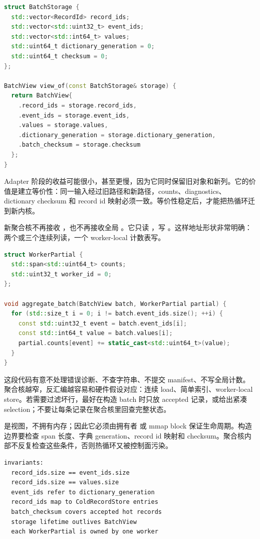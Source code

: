 \begin{lstlisting}[language=C++,caption={adapter 把旧对象转换为热列存储}]
struct BatchStorage {
  std::vector<RecordId> record_ids;
  std::vector<std::uint32_t> event_ids;
  std::vector<std::int64_t> values;
  std::uint64_t dictionary_generation = 0;
  std::uint64_t checksum = 0;
};

BatchView view_of(const BatchStorage& storage) {
  return BatchView{
    .record_ids = storage.record_ids,
    .event_ids = storage.event_ids,
    .values = storage.values,
    .dictionary_generation = storage.dictionary_generation,
    .batch_checksum = storage.checksum
  };
}
\end{lstlisting}

Adapter 阶段的收益可能很小，甚至更慢，因为它同时保留旧对象和新列。它的价值是建立等价性：同一输入经过旧路径和新路径，counts、diagnostics、dictionary checksum 和 record id 映射必须一致。等价性稳定后，才能把热循环迁到新内核。

新聚合核不再接收 ，也不再接收全局 。它只读 ，写 。这样地址形状非常明确：两个或三个连续列读，一个 worker-local 计数表写。

\begin{lstlisting}[language=C++,caption={BatchView 聚合核只保留热路径依赖}]
struct WorkerPartial {
  std::span<std::uint64_t> counts;
  std::uint32_t worker_id = 0;
};

void aggregate_batch(BatchView batch, WorkerPartial partial) {
  for (std::size_t i = 0; i != batch.event_ids.size(); ++i) {
    const std::uint32_t event = batch.event_ids[i];
    const std::int64_t value = batch.values[i];
    partial.counts[event] += static_cast<std::uint64_t>(value);
  }
}
\end{lstlisting}

这段代码有意不处理错误诊断、不查字符串、不提交 manifest、不写全局计数。聚合核越窄，反汇编越容易和硬件假设对应：连续 load、简单索引、worker-local store。若需要过滤坏行，最好在构造 batch 时只放 accepted 记录，或给出紧凑 selection；不要让每条记录在聚合核里回查完整状态。

 是视图，不拥有内存；因此它必须由拥有者  或 mmap block 保证生命周期。构造边界要检查 span 长度、字典 generation、record id 映射和 checksum。聚合核内部不反复检查这些条件，否则热循环又被控制面污染。

\begin{lstlisting}[numbers=none,caption={BatchView 构造边界的不变量}]
invariants:
  record_ids.size == event_ids.size
  record_ids.size == values.size
  event_ids refer to dictionary_generation
  record_ids map to ColdRecordStore entries
  batch_checksum covers accepted hot records
  storage lifetime outlives BatchView
  each WorkerPartial is owned by one worker
\end{lstlisting}

